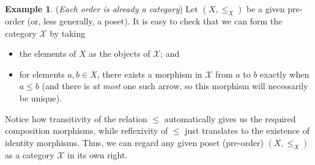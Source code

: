 \documentclass[a4paper]{book}
\theoremstyle{definition}
\newtheorem{example}{Example}[section]
\theoremstyle{definition}
\theoremstyle{definition}
\theoremstyle{theorem}
\theoremstyle{definition}
\begin{document}
\begin{example}
	(\textit{Each order is already a category}) Let $(X, \leq_X)$ be a given pre-order (or, less generally, a poset). It is easy to check that we can form the category $\mathcal{X}$ by taking 
	\begin{itemize}
		\item the elements of $X$ as the objects of $\mathcal{X}$; and  
		\item for elements $a, b \in X$, there exists a morphism in $\mathcal{X}$ from $a$ to $b$ exactly when $a \leq b$ (and there is \textit{at most} one such arrow, so this morphism will necessarily be unique). 
	\end{itemize}
Notice how transitivity of the relation $\leq$ automatically gives us the required composition morphisms, while reflexivity of $\leq$ just translates to the existence of identity morphisms. Thus, we can regard any given poset (pre-order) $(X, \leq_X)$ as a category $\mathcal{X}$ in its own right.  
\end{example}
\end{document}
